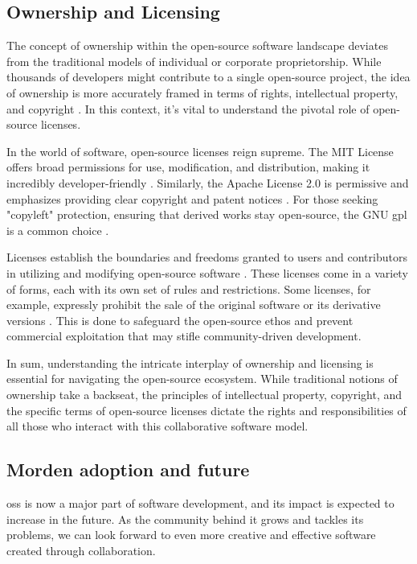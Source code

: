 \subsection{Ownership and Licensing}

The concept of ownership within the open-source software landscape deviates from the traditional models of individual or corporate proprietorship. While thousands of developers might contribute to a single open-source project, the idea of ownership is more accurately framed in terms of rights, intellectual property, and copyright \cite{Codeownership}.  In this context, it's vital to understand the pivotal role of open-source licenses.

In the world of software, open-source licenses reign supreme. The MIT License offers broad permissions for use, modification, and distribution, making it incredibly developer-friendly \cite{saltzer2020origin}. Similarly, the Apache License 2.0 is permissive and emphasizes providing clear copyright and patent notices \cite{sinclair2010license}. For those seeking "copyleft" protection, ensuring that derived works stay open-source, the GNU \ac{gpl} is a common choice \cite{license1989gnu}.

Licenses establish the boundaries and freedoms granted to users and contributors in utilizing and modifying open-source software \cite{laurent2004understanding}. These licenses come in a variety of forms, each with its own set of rules and restrictions. Some licenses, for example, expressly prohibit the sale of the original software or its derivative versions \cite{madison2003reconstructing}. This is done to safeguard the open-source ethos and prevent commercial exploitation that may stifle community-driven development.

In sum, understanding the intricate interplay of ownership and licensing is essential for navigating the open-source ecosystem. While traditional notions of ownership take a backseat, the principles of intellectual property, copyright, and the specific terms of open-source licenses dictate the rights and responsibilities of all those who interact with this collaborative software model.


\subsection{Morden adoption and future}
\ac{oss} is now a major part of software development, and its impact is expected to increase in the future. As the community behind it grows and tackles its problems, we can look forward to even more creative and effective software created through collaboration.

